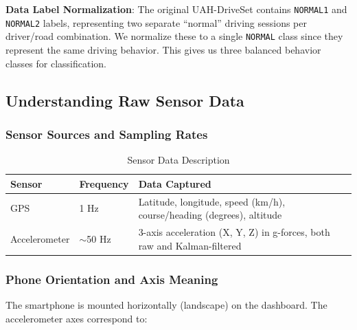 \documentclass[11pt,a4paper]{article}
\begin{document}
\textbf{Data Label Normalization}: The original UAH-DriveSet contains \texttt{NORMAL1} and \texttt{NORMAL2} labels, representing two separate ``normal'' driving sessions per driver/road combination. We normalize these to a single \texttt{NORMAL} class since they represent the same driving behavior. This gives us three balanced behavior classes for classification.

\subsection{Understanding Raw Sensor Data}

\subsubsection{Sensor Sources and Sampling Rates}

\begin{table}[H]
\centering
\caption{Sensor Data Description}
\begin{tabular}{p{3cm}p{2cm}p{7cm}}
\toprule
\textbf{Sensor} & \textbf{Frequency} & \textbf{Data Captured} \\
\midrule
GPS & 1 Hz & Latitude, longitude, speed (km/h), course/heading (degrees), altitude \\
Accelerometer & $\sim$50 Hz & 3-axis acceleration (X, Y, Z) in g-forces, both raw and Kalman-filtered \\
\bottomrule
\end{tabular}
\end{table}

\subsubsection{Phone Orientation and Axis Meaning}

The smartphone is mounted horizontally (landscape) on the dashboard. The accelerometer axes correspond to:
\end{document}
